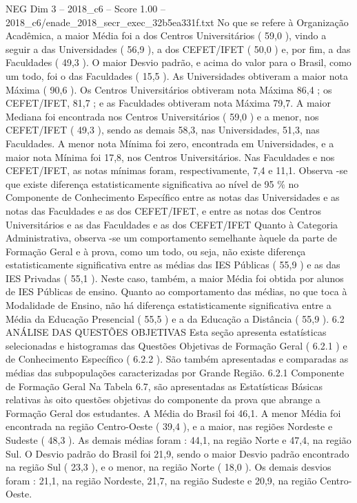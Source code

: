 \begin{textsample}{NEG Dim 3 – 2018\_c6 – Score 1.00 – 2018\_c6/enade\_2018\_secr\_exec\_32b5ea331f.txt}
No que se refere à Organização Acadêmica, a maior Média foi a dos Centros Universitários ( 59,0 ), vindo a seguir a das Universidades ( 56,9 ), a dos CEFET/IFET ( 50,0 ) e, por fim, a das Faculdades ( 49,3 ).
O maior Desvio padrão, e acima do valor para o Brasil, como um todo, foi o das Faculdades ( 15,5 ).
As Universidades obtiveram a maior nota Máxima ( 90,6 ).
Os Centros Universitários obtiveram nota Máxima 86,4 ; os CEFET/IFET, 81,7 ; e as Faculdades obtiveram nota Máxima 79,7.
A maior Mediana foi encontrada nos Centros Universitários ( 59,0 ) e a menor, nos CEFET/IFET ( 49,3 ), sendo as demais 58,3, nas Universidades, 51,3, nas Faculdades.
A menor nota Mínima foi zero, encontrada em Universidades, e a maior nota Mínima foi 17,8, nos Centros Universitários.
Nas Faculdades e nos CEFET/IFET, as notas mínimas foram, respectivamente, 7,4 e 11,1.
Observa -se que existe diferença estatisticamente significativa ao nível de 95 \% no Componente de Conhecimento Específico entre as notas das Universidades e as notas das Faculdades e as dos CEFET/IFET, e entre as notas dos Centros Universitários e as das Faculdades e as dos CEFET/IFET Quanto à Categoria Administrativa, observa -se um comportamento semelhante àquele da parte de Formação Geral e à prova, como um todo, ou seja, não existe diferença estatisticamente significativa entre as médias das IES Públicas ( 55,9 ) e as das IES Privadas ( 55,1 ).
Neste caso, também, a maior Média foi obtida por alunos de IES Públicas de ensino.
Quanto ao comportamento das médias, no que toca à Modalidade de Ensino, não há diferença estatisticamente significativa entre a Média da Educação Presencial ( 55,5 ) e a da Educação a Distância ( 55,9 ). 6.2 ANÁLISE DAS QUESTÕES OBJETIVAS Esta seção apresenta estatísticas selecionadas e histogramas das Questões Objetivas de Formação Geral ( 6.2.1 ) e de Conhecimento Específico ( 6.2.2 ).
São também apresentadas e comparadas as médias das subpopulações caracterizadas por Grande Região. 6.2.1 Componente de Formação Geral Na Tabela 6.7, são apresentadas as Estatísticas Básicas relativas às oito questões objetivas do componente da prova que abrange a Formação Geral dos estudantes.
A Média do Brasil foi 46,1.
A menor Média foi encontrada na região Centro-Oeste ( 39,4 ), e a maior, nas regiões Nordeste e Sudeste ( 48,3 ).
As demais médias foram : 44,1, na região Norte e 47,4, na região Sul.
O Desvio padrão do Brasil foi 21,9, sendo o maior Desvio padrão encontrado na região Sul ( 23,3 ), e o menor, na região Norte ( 18,0 ).
Os demais desvios foram : 21,1, na região Nordeste, 21,7, na região Sudeste e 20,9, na região Centro-Oeste.

\end{textsample}
